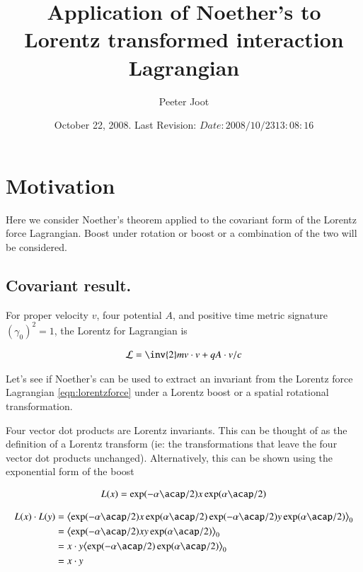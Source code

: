 \documentclass{article}      %
\title{ Application of Noether's to Lorentz transformed interaction Lagrangian } %
\author{Peeter Joot}         %
\date{ October 22, 2008.  Last Revision: $Date: 2008/10/23 13:08:16 $ } %
\begin{document}

\maketitle{}

\tableofcontents

\section{ Motivation }

Here we consider Noether's theorem applied to the covariant form of the Lorentz force Lagrangian.  Boost under rotation or boost or a combination of the two will be considered.

\subsection{ Covariant result. } 

For proper velocity $v$, four potential $A$, and positive time metric signature $(\gamma_0)^2 = 1$, the Lorentz for
Lagrangian is

\begin{align}\label{eqn:lorentzforce}
\LL = \inv{2}m v \cdot v + q A \cdot v/c
\end{align}

Let's see if Noether's can be used to extract an invariant from 
the Lorentz force Lagrangian \ref{eqn:lorentzforce} under a
Lorentz boost or a spatial rotational transformation.

Four vector dot products are Lorentz invariants.  This can be thought of as the definition of a Lorentz transform (ie: the transformations
that leave the four vector dot products unchanged).  Alternatively, this can be shown using the exponential form of the boost

\begin{align*}
L(x) = \exp(-\alpha \acap/2) x \exp(\alpha \acap/2)
\end{align*}

\begin{align*}
L(x) \cdot L(y)
&= \gpgradezero{ \exp(-\alpha \acap/2) x \exp(\alpha \acap/2) \exp(-\alpha \acap/2) y \exp(\alpha \acap/2) } \\
&= \gpgradezero{ \exp(-\alpha \acap/2) x y \exp(\alpha \acap/2) } \\
&= x \cdot y \gpgradezero{ \exp(-\alpha \acap/2) \exp(\alpha \acap/2) } \\
&= x \cdot y \\
\end{align*}
\end{document}
